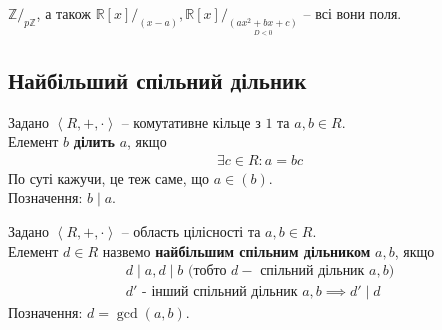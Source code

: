 \documentclass{math_library}
\begin{document}
\begin{example}
$\mathbb{Z}/_{p\mathbb{Z}}$, а також $\mathbb{R}[x]/_{(x-a)}, \mathbb{R}[x]/_{\underset{D<0}{(ax^2+bx+c)}}$ -- всі вони поля.
\end{example}

\subsection{Найбільший спільний дільник}
\begin{definition}
Задано $\left< R,+,\cdot\right>$ -- комутативне кільце з $1$ та $a,b \in R$.\\
Елемент $b$ \textbf{ділить} $a$, якщо
\begin{align*}
\exists c \in R: a = bc
\end{align*}
По суті кажучи, це теж саме, що $a \in (b)$.\\
Позначення: $b \mid a$.
\end{definition}

\begin{definition}
Задано $\left< R,+,\cdot\right>$ -- область цілісності та $a,b \in R$.\\
Елемент $d \in R$ назвемо \textbf{найбільшим спільним дільником} $a,b$, якщо
\begin{align*}
d \mid a, d \mid b \text{ (тобто } d - \text{ спільний дільник } a,b\text{)}\\
d' \text{ - інший спільний дільник } a,b \implies d' \mid d
\end{align*}
Позначення: $d = \gcd(a,b)$.
\end{definition}
\end{document}
